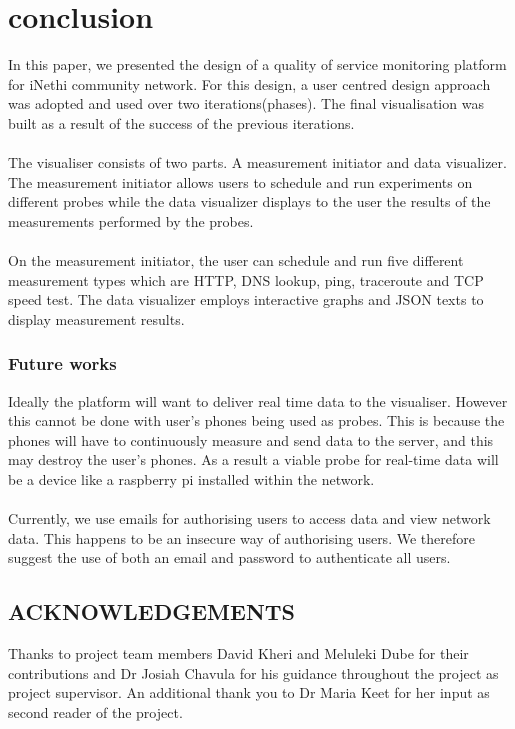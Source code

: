 \section{conclusion}
In this paper, we presented the design of a quality of service monitoring platform for iNethi community network. For this design, a user centred design approach was adopted and used over two iterations(phases). The final visualisation was built as a result of the success of the previous iterations.
\paragraph{}
The visualiser consists of two parts. A measurement initiator and data visualizer. The measurement initiator allows users to schedule and run experiments on different probes while the data visualizer displays to the user the results of the measurements performed by the probes. 
\paragraph{}
On the measurement initiator, the user can schedule and run five different measurement types which are HTTP, DNS lookup, ping, traceroute and TCP speed test. The data visualizer employs interactive graphs and JSON texts to display measurement results.
\subsubsection{Future works}
Ideally the platform will want to deliver real time data to the visualiser. However this cannot be done with user's phones being used as probes. This is because the phones will have to continuously measure and send data to the server, and this may destroy the user's phones. As a result a viable probe for real-time data will be a device like a raspberry pi installed within the network.
\paragraph{}
Currently, we use emails for authorising users to access data and view network data. This happens to be an insecure way of authorising users. We therefore suggest the use of both an email and password to authenticate all users.
\subsection{ACKNOWLEDGEMENTS}
Thanks to project team members David Kheri and Meluleki Dube for their contributions and Dr Josiah Chavula for his guidance throughout the project as project supervisor. An additional thank you to Dr Maria Keet for her input as second reader of the project. 